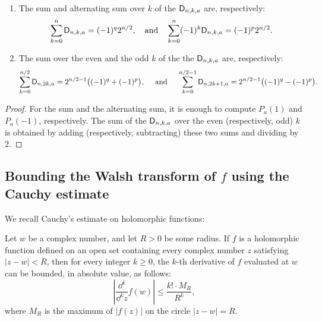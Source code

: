 \documentclass[11pt]{llncs}
\begin{document}
\begin{proposition}\mbox{}
    \begin{enumerate}
        \item The sum and alternating sum over $k$ of the $\mathsf{D}_{n,k,a}$ are, respectively:
\[
 \sum_{k=0}^n\mathsf{D}_{n,k,a}=(-1)^{q}2^{n/2}, \quad \text{and} \quad
 \sum_{k=0}^n(-1)^k\mathsf{D}_{n,k,a}=(-1)^{p}2^{n/2}.
\]
        \item The sum over the even and the odd $k$ of the the $\mathsf{D}_{n,k,a}$ are, respectively:
\[
\sum_{k=0}^{n/2}\mathsf{D}_{n,2k,a}=2^{n/2-1}\big((-1)^{q}+(-1)^{p}\big), \quad \text{ and } \quad 
\sum_{k=0}^{n/2-1}\mathsf{D}_{n,2k+1,a}=2^{n/2-1}\big((-1)^{q}-(-1)^{p}\big).
\]
    
    \end{enumerate}

\end{proposition}

\begin{proof}
	For the sum and the alternating sum, it is enough to compute $P_a(1)$ and $P_a(-1)$, respectively. The sum of the $\mathsf{D}_{n,k,a}$ over the even (respectively, odd) $k$ is obtained by adding (respectively, subtracting) these two sums and dividing by $2$.
\end{proof}

\subsection{Bounding the Walsh transform of $f$ using the Cauchy estimate}\label{sec:Cauchy}


We recall Cauchy's estimate on holomorphic functions:

\begin{Prop}\label{property:cauchy_estimate}
    Let $w$ be a complex number, and let $R>0$ be some radius. If $f$ is a holomorphic function defined on an open set containing every complex number $z$ satisfying $|z-w|<R$, then for every integer $k\geq 0$, the $k$-th derivative of $f$ evaluated at $w$ can be bounded, in absolute value, as follows:
    \[
        \left|\frac{\dd^k}{\dd^k z}f(w)\right|\leq\frac{k!\cdot M_R}{R^k},
    \]
    where $M_R$ is the maximum of $|f(z)|$ on the circle $|z-w|=R$.
\end{Prop}
\end{document}
